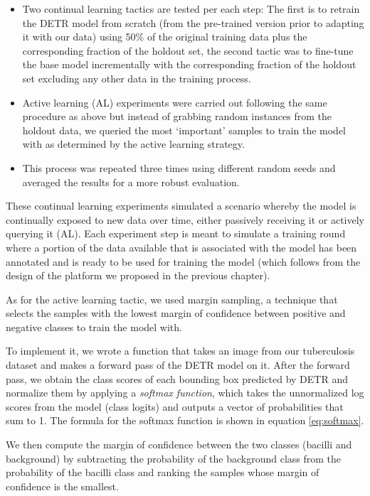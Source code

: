 \documentclass[../main.tex]{subfiles}
\begin{document}
    \begin{itemize}
        \item Two continual learning tactics are tested per each step: The first is to retrain the DETR model from scratch (from the pre-trained version prior to adapting it with our data) using 50\% of the original training data plus the corresponding fraction of the holdout set, the second tactic was to fine-tune the base model incrementally with the corresponding fraction of the holdout set excluding any other data in the training process.
        \item Active learning (AL) experiments were carried out following the same procedure as above but instead of grabbing random instances from the holdout data, we queried the most `important' samples to train the model with as determined by the active learning strategy.
        \item This process was repeated three times using different random seeds and averaged the results for a more robust evaluation.
    \end{itemize}

    These continual learning experiments simulated a scenario whereby the model is continually exposed to new data over time, either passively receiving it or actively querying it (AL). Each experiment step is meant to simulate a training round where a portion of the data available that is associated with the model has been annotated and is ready to be used for training the model (which follows from the design of the platform we proposed in the previous chapter).
    
    \clearpage
    As for the active learning tactic, we used margin sampling, a technique that selects the samples with the lowest margin of confidence between positive and negative classes to train the model with.
    
    To implement it, we wrote a function that takes an image from our tuberculosis dataset and makes a forward pass of the DETR model on it. After the forward pass, we obtain the class scores of each bounding box predicted by DETR and normalize them by applying a \textit{softmax function}, which takes the unnormalized log scores from the model (class logits) and outputs a vector of probabilities that sum to 1. The formula for the softmax function is shown in equation \ref{eq:softmax}.
    
    We then compute the margin of confidence between the two classes (bacilli and background) by subtracting the probability of the background class from the probability of the bacilli class and ranking the samples whose margin of confidence is the smallest.
\end{document}
